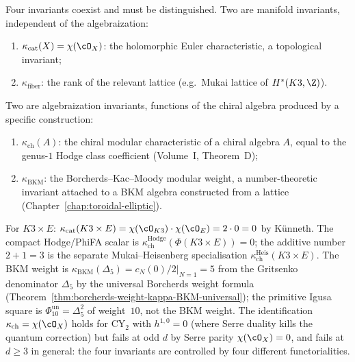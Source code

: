 \begin{remark}
\label{rem:kappa-cat-vs-others}
Four invariants coexist and must be distinguished. Two are
manifold invariants, independent of the algebraization:
\begin{enumerate}[label=(\roman*)]
 \item $\kappa_{\mathrm{cat}}(X) = \chi(\cO_X)$: the holomorphic
 Euler characteristic, a topological invariant;
 \item $\kappa_{\mathrm{fiber}}$: the rank of the relevant lattice
 (e.g.\ Mukai lattice of $H^*(K3, \Z)$).
\end{enumerate}
Two are algebraization invariants, functions of the chiral algebra
produced by a specific construction:
\begin{enumerate}[resume,label=(\roman*)]
 \item $\kappa_{\mathrm{ch}}(A)$: the chiral modular characteristic
 of a chiral algebra $A$, equal to the genus-$1$ Hodge class
 coefficient (Volume~I, Theorem~D);
 \item $\kappa_{\mathrm{BKM}}$: the Borcherds--Kac--Moody modular
 weight, a number-theoretic invariant attached to a BKM algebra
 constructed from a lattice (Chapter~\ref{chap:toroidal-elliptic}).
\end{enumerate}
For $K3 \times E$:
$\kappa_{\mathrm{cat}}(K3 \times E) = \chi(\cO_{K3}) \cdot \chi(\cO_E)
 = 2 \cdot 0 = 0$ by K\"unneth. The compact Hodge/PhiFA scalar is
$\kappa_{\mathrm{ch}}^{\mathrm{Hodge}}(\Phi(K3 \times E))=0$; the additive number
$2+1=3$ is the separate Mukai--Heisenberg specialisation
$\kappa_{\mathrm{ch}}^{\mathrm{Heis}}(K3\times E)$. The BKM weight is
$\kappa_{\mathrm{BKM}}(\Delta_5) = \left.c_N(0)/2\right|_{N=1} = 5$
from the Gritsenko denominator $\Delta_5$ by the universal Borcherds
weight formula (Theorem~\ref{thm:borcherds-weight-kappa-BKM-universal});
the primitive Igusa square is
$\Phi_{10}^{\mathrm{un}}=\Delta_5^2$ of weight~$10$, not the BKM weight.
The identification $\kappa_{\mathrm{ch}} = \chi(\cO_X)$ holds for
CY$_2$ with $h^{1,0} = 0$ (where Serre duality kills the quantum
correction) but fails at odd $d$ by Serre parity
$\chi(\cO_X) = 0$, and fails at $d \geq 3$ in general: the four
invariants are controlled by four different functorialities.
\end{remark}


